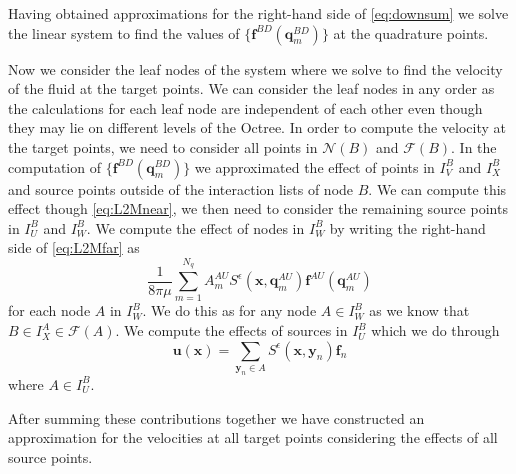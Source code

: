 Having obtained approximations for the right-hand side of \cref{eq:downsum} we solve the linear system to find the values of $\{\bm{f}^{BD}(\bm{q}^{BD}_m)\}$ at the quadrature points.

Now we consider the leaf nodes of the system where we solve to find the velocity of the fluid at the target points. We can consider the leaf nodes in any order as the calculations for each leaf node are independent of each other even though they may lie on different levels of the Octree. In order to compute the velocity at the target points, we need to consider all points in $\mathcal{N}(B)$ and $\mathcal{F}(B)$. In the computation of  $\{\bm{f}^{BD}(\bm{q}^{BD}_m)\}$ we approximated the effect of points in $I_V^B$ and $I_X^B$ and source points outside of the interaction lists of node $B$. We can compute this effect though \cref{eq:L2Mnear}, we then need to consider the remaining source points in $I_U^B$ and $I_W^B$. We compute the effect of nodes in $I_W^B$ by writing the right-hand side of \cref{eq:L2Mfar} as
\begin{equation*}
    \frac{1}{8 \pi \mu} \sum_{m=1}^{N_{q}} A_{m}^{AU} S^\epsilon\left(\bm{x}, \bm{q}_{m}^{A U}\right) \bm{f}^{A U}\left(\bm{q}_{m}^{A U}\right)
\end{equation*}
for each node $A$ in $I_W^B$. We do this as for any node $A \in I_W^B$ as we know that $B \in I_X^A \in \mathcal{F}(A)$. We compute the effects of sources in $I_U^B$ which we do through
\begin{equation}
\label{eq:U}
    \bm{u}(\bm{x}) = \sum_{{\bm{y}}_n\in A} S^\epsilon(\bm{x},{\bm{y}}_n){\bm{f}}_n
\end{equation}
where $A \in I_U^B$.

After summing these contributions together we have constructed an approximation for the velocities at all target points considering the effects of all source points.

